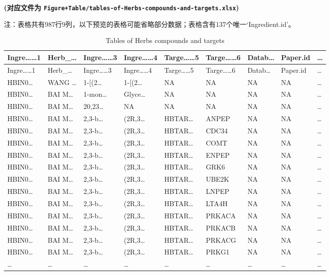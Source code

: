 \documentclass[
]{article}
\begin{document}
\textbf{(对应文件为 \texttt{Figure+Table/tables-of-Herbs-compounds-and-targets.xlsx})}

\begin{center}\begin{tcolorbox}[colback=gray!10, colframe=gray!50, width=0.9\linewidth, arc=1mm, boxrule=0.5pt]注：表格共有987行9列，以下预览的表格可能省略部分数据；表格含有137个唯一`Ingredient.id'。
\end{tcolorbox}
\end{center}

\begin{longtable}[]{@{}lllllllll@{}}
\caption{\label{tab:tables-of-Herbs-compounds-and-targets}Tables of Herbs compounds and targets}\tabularnewline
\toprule
Ingre\ldots\ldots1 & Herb\_\ldots{} & Ingre\ldots\ldots3 & Ingre\ldots\ldots4 & Targe\ldots\ldots5 & Targe\ldots\ldots6 & Datab\ldots{} & Paper.id & \ldots{}\tabularnewline
\midrule
\endfirsthead
\toprule
Ingre\ldots\ldots1 & Herb\_\ldots{} & Ingre\ldots\ldots3 & Ingre\ldots\ldots4 & Targe\ldots\ldots5 & Targe\ldots\ldots6 & Datab\ldots{} & Paper.id & \ldots{}\tabularnewline
\midrule
\endhead
HBIN0\ldots{} & WANG \ldots{} & 1-{[}(2\ldots{} & 1-{[}(2\ldots{} & NA & NA & NA & NA & \ldots{}\tabularnewline
HBIN0\ldots{} & BAI M\ldots{} & 1-mon\ldots{} & Glyce\ldots{} & NA & NA & NA & NA & \ldots{}\tabularnewline
HBIN0\ldots{} & BAI M\ldots{} & 20,23\ldots{} & NA & NA & NA & NA & NA & \ldots{}\tabularnewline
HBIN0\ldots{} & BAI M\ldots{} & 2,3-b\ldots{} & (2R,3\ldots{} & HBTAR\ldots{} & ANPEP & NA & NA & \ldots{}\tabularnewline
HBIN0\ldots{} & BAI M\ldots{} & 2,3-b\ldots{} & (2R,3\ldots{} & HBTAR\ldots{} & CDC34 & NA & NA & \ldots{}\tabularnewline
HBIN0\ldots{} & BAI M\ldots{} & 2,3-b\ldots{} & (2R,3\ldots{} & HBTAR\ldots{} & COMT & NA & NA & \ldots{}\tabularnewline
HBIN0\ldots{} & BAI M\ldots{} & 2,3-b\ldots{} & (2R,3\ldots{} & HBTAR\ldots{} & ENPEP & NA & NA & \ldots{}\tabularnewline
HBIN0\ldots{} & BAI M\ldots{} & 2,3-b\ldots{} & (2R,3\ldots{} & HBTAR\ldots{} & GRK6 & NA & NA & \ldots{}\tabularnewline
HBIN0\ldots{} & BAI M\ldots{} & 2,3-b\ldots{} & (2R,3\ldots{} & HBTAR\ldots{} & UBE2K & NA & NA & \ldots{}\tabularnewline
HBIN0\ldots{} & BAI M\ldots{} & 2,3-b\ldots{} & (2R,3\ldots{} & HBTAR\ldots{} & LNPEP & NA & NA & \ldots{}\tabularnewline
HBIN0\ldots{} & BAI M\ldots{} & 2,3-b\ldots{} & (2R,3\ldots{} & HBTAR\ldots{} & LTA4H & NA & NA & \ldots{}\tabularnewline
HBIN0\ldots{} & BAI M\ldots{} & 2,3-b\ldots{} & (2R,3\ldots{} & HBTAR\ldots{} & PRKACA & NA & NA & \ldots{}\tabularnewline
HBIN0\ldots{} & BAI M\ldots{} & 2,3-b\ldots{} & (2R,3\ldots{} & HBTAR\ldots{} & PRKACB & NA & NA & \ldots{}\tabularnewline
HBIN0\ldots{} & BAI M\ldots{} & 2,3-b\ldots{} & (2R,3\ldots{} & HBTAR\ldots{} & PRKACG & NA & NA & \ldots{}\tabularnewline
HBIN0\ldots{} & BAI M\ldots{} & 2,3-b\ldots{} & (2R,3\ldots{} & HBTAR\ldots{} & PRKG1 & NA & NA & \ldots{}\tabularnewline
\ldots{} & \ldots{} & \ldots{} & \ldots{} & \ldots{} & \ldots{} & \ldots{} & \ldots{} & \ldots{}\tabularnewline
\bottomrule
\end{longtable}
\end{document}

